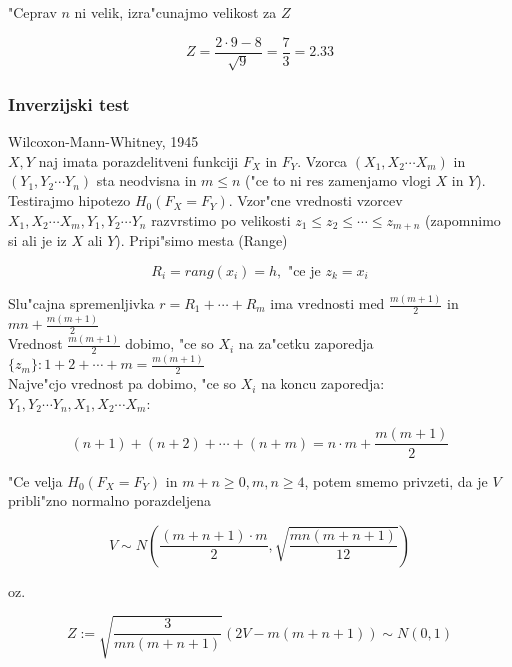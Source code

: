 \documentclass[a4paper,12pt]{article}
\theoremstyle{definition}
\theoremstyle{remark}
\begin{document}
"Ceprav $n$ ni velik, izra"cunajmo velikost za $Z$

\begin{equation*}
    Z = \frac{2 \cdot 9 - 8}{\sqrt{9}} = \frac{7}{3} = 2.33
\end{equation*}


\subsubsection{Inverzijski test}

Wilcoxon-Mann-Whitney, 1945 \\
$X, Y$ naj imata porazdelitveni funkciji $F_X$ in $F_Y$. Vzorca $(X_1, X_2 \cdots X_m)$ in $(Y_1, Y_2 \cdots Y_n)$ sta neodvisna in
$m \leq n$ ("ce to ni res zamenjamo vlogi $X$ in $Y$). Testirajmo hipotezo $H_0(F_X = F_Y)$. Vzor"cne vrednosti vzorcev
$X_1, X_2 \cdots X_m, Y_1, Y_2 \cdots Y_n$ razvrstimo po velikosti $z_1 \leq z_2 \leq \cdots \leq z_{m+n}$ (zapomnimo si ali je iz
$X$ ali $Y$). Pripi"simo mesta (Range)

\begin{equation*}
    R_i = rang(x_i) = h, \text{ "ce je } z_k = x_i
\end{equation*}

Slu"cajna spremenljivka $r = R_1 + \cdots + R_m$ ima vrednosti med $\frac{m(m+1)}{2}$ in $mn + \frac{m(m+1)}{2}$ \\
Vrednost $\frac{m(m+1)}{2}$ dobimo, "ce so $X_i$ na za"cetku zaporedja $\{z_m\}: 1 + 2 + \cdots + m = \frac{m(m+1)}{2}$ \\
Najve"cjo vrednost pa dobimo, "ce so $X_i$ na koncu zaporedja: $Y_1, Y_2 \cdots Y_n, X_1, X_2 \cdots X_m$:

\begin{equation*}
    (n+1) + (n+2) + \cdots + (n+m) = n \cdot m + \frac{m(m+1)}{2}
\end{equation*}

"Ce velja $H_0(F_X = F_Y)$ in $m + n \geq 0, m, n \geq 4$, potem smemo privzeti, da je $V$ pribli"zno normalno porazdeljena

\begin{equation*}
    V \sim N(\frac{(m+n+1) \cdot m}{2}, \sqrt{\frac{mn (m+n+1)}{12}})
\end{equation*}




oz.

\begin{equation*}
    Z := \sqrt{\frac{3}{mn(m+n+1)}} (2V - m(m+n+1)) \sim N(0,1)
\end{equation*}
\end{document}

